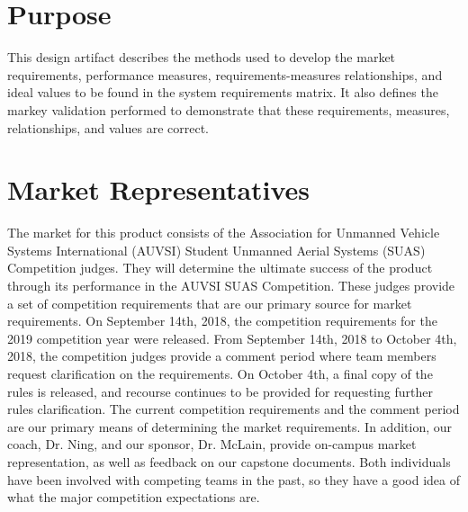 \documentclass[]{auvsi_doc}
\begin{document}
\begin{AUVSITitlePage}

\begin{artifacttable}
\end{artifacttable}

\end{AUVSITitlePage}

\section{Purpose}

This design artifact describes the methods used to develop the market requirements, performance measures, requirements-measures relationships, and ideal values to be found in the system requirements matrix. It also defines the markey validation performed to demonstrate that these requirements, measures, relationships, and values are correct.

\section{Market Representatives}
The market for this product consists of the Association for Unmanned Vehicle Systems International (AUVSI) Student Unmanned Aerial Systems (SUAS) Competition judges.
They will determine the ultimate success of the product through its performance in the AUVSI SUAS Competition.
These judges provide a set of competition requirements that are our primary source for market requirements.
On September 14th, 2018, the competition requirements for the 2019 competition year were released.
From September 14th, 2018 to October 4th, 2018, the competition judges provide a comment period where team members request clarification on the requirements. On October 4th, a final copy of the rules is released, and recourse continues to be provided for requesting further rules clarification.
The current competition requirements and the comment period are our primary means of determining the market requirements.
In addition, our coach, Dr. Ning, and our sponsor, Dr. McLain, provide on-campus market representation, as well as feedback on our capstone documents. Both individuals have been involved with competing teams in the past, so they have a good idea of what the major competition expectations are.
\end{document}

